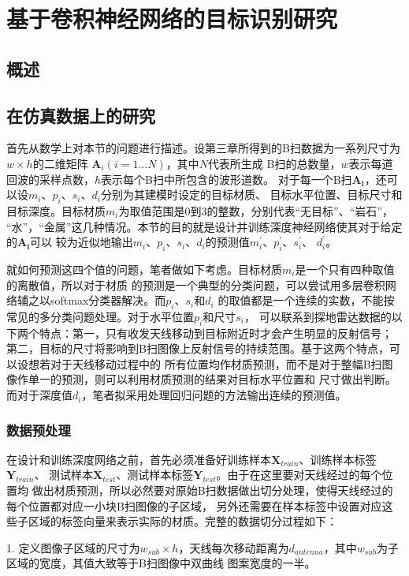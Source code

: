 \chapter{基于卷积神经网络的目标识别研究}
\section{概述}
\section{在仿真数据上的研究}
首先从数学上对本节的问题进行描述。设第三章所得到的B扫数据为一系列尺寸为$w\times h$的二维矩阵
$\mathbf{A}_i(i = 1...N)$，其中$N$代表所生成
B扫的总数量，$w$表示每道回波的采样点数，$h$表示每个B扫中所包含的波形道数。
对于每一个B扫$\mathbf{A_i}$，还可以设$m_i$、$p_i$、$s_i$、$d_i$分别为其建模时设定的目标材质、
目标水平位置、目标尺寸和目标深度。目标材质$m_i$为取值范围是0到3的整数，分别代表“无目标”、“岩石”，
“水”，“金属”这几种情况。本节的目的就是设计并训练深度神经网络使其对于给定的$\mathbf{A_i}$可以
较为近似地输出$m_i$、$p_i$、$s_i$、$d_i$的预测值$m_i^{\prime}$、$p_i^{\prime}$、$s_i^{\prime}$、
$d_i^{\prime}$。

就如何预测这四个值的问题，笔者做如下考虑。目标材质$m_i$是一个只有四种取值的离散值，所以对于材质
的预测是一个典型的分类问题，可以尝试用多层卷积网络辅之以softmax分类器解决。而$p_i$、$s_i$和$d_i$
的取值都是一个连续的实数，不能按常见的多分类问题处理。对于水平位置$p_i$和尺寸$s_i$，
可以联系到探地雷达数据的以下两个特点：第一，只有收发天线移动到目标附近时才会产生明显的反射信号；
第二，目标的尺寸将影响到B扫图像上反射信号的持续范围。基于这两个特点，可以设想若对于天线移动过程中的
所有位置均作材质预测，而不是对于整幅B扫图像作单一的预测，则可以利用材质预测的结果对目标水平位置和
尺寸做出判断。而对于深度值$d_i$，笔者拟采用处理回归问题的方法输出连续的预测值。
\subsection{数据预处理}
在设计和训练深度网络之前，首先必须准备好训练样本$\mathbf{X}_{train}$、训练样本标签$\mathbf{Y}_{train}$、
测试样本$\mathbf{X}_{test}$、测试样本标签$\mathbf{Y}_{test}$。由于在这里要对天线经过的每个位置均
做出材质预测，所以必然要对原始B扫数据做出切分处理，使得天线经过的每个位置都对应一小块B扫图像的子区域，
另外还需要在样本标签中设置对应这些子区域的标签向量来表示实际的材质。完整的数据切分过程如下：

1. 定义图像子区域的尺寸为$w_{sub}\times h$，天线每次移动距离为$d_{antenna}$，其中$w_{sub}$为子区域的宽度，其值大致等于B扫图像中双曲线
图案宽度的一半。

